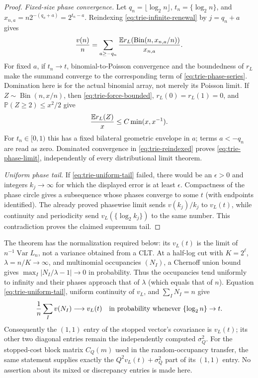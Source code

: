 \documentclass[11pt]{article}
\numberwithin{equation}{section}
\newcommand{\1}{\mathbf 1}\newcommand{\F}{\mathcal F}\newcommand{\D}{\mathcal D}
\begin{document}
\begin{proof}
\emph{Fixed-size phase convergence.}
Let $q_n=\lfloor\log _2n\rfloor$, $t_n=\{\log _2n\}$, and
$x_{n,a}=n2^{-(q_n+a)}=2^{t_n-a}$.  Reindexing
\eqref{eq:trie-infinite-renewal} by $j=q_n+a$ gives
\begin{equation}
 {v(n)\over n}=\sum_{a\ge-q_n}{
 \mathbb E r_L(\operatorname {Bin}(n,x_{n,a}/n))\over x_{n,a}}.      \label{eq:trie-reindexed}
\end{equation}
For fixed $a$, if $t_n\to t$, binomial-to-Poisson convergence and the
boundedness of $r_L$ make the summand converge to the corresponding term of
\eqref{eq:trie-phase-series}.  Domination here is for the actual binomial
array, not merely its Poisson limit.  If $Z\sim\operatorname {Bin}(n,x/n)$,
then \eqref{eq:trie-force-bounded}, $r_L(0)=r_L(1)=0$, and
$\mathbb P(Z\ge2)\le x^2/2$ give
\begin{equation}
 {\mathbb E r_L(Z)\over x}\le C\min(x,x^{-1}).           \label{eq:trie-binomial-majorant}
\end{equation}
For $t_n\in[0,1)$ this has a fixed bilateral geometric envelope in $a$;
terms $a<-q_n$ are read as zero.  Dominated convergence in
\eqref{eq:trie-reindexed} proves \eqref{eq:trie-phase-limit}, independently
of every distributional limit theorem.

\emph{Uniform phase tail.}
If \eqref{eq:trie-uniform-tail} failed, there would be an $\epsilon>0$ and
integers $k_j\to\infty$ for which the displayed error is at least
$\epsilon$.  Compactness of the phase circle gives a subsequence whose
phases converge to some $t$ (with endpoints identified).  The already proved
phasewise limit sends $v(k_j)/k_j$ to $v_L(t)$, while continuity and
periodicity send $v_L(\{\log _2k_j\})$ to the same number.  This
contradiction proves the claimed supremum tail.
\end{proof}

The theorem has the normalization required below: its $v_L(t)$ is the limit
of $n^{-1}\operatorname {Var}L_n$, not a variance obtained from a CLT.  At a
half-log cut with $K=2^\ell$, $\lambda=n/K\to\infty$, and multinomial
occupancies $(N_I)$, a Chernoff union bound gives
$\max_I|N_I/\lambda-1|\to0$ in probability.  Thus the occupancies tend
uniformly to infinity and their phases approach that of
$\lambda$ (which equals that of $n$).  Equation
\eqref{eq:trie-uniform-tail}, uniform continuity of $v_L$, and
$\sum_I N_I=n$ give
\begin{equation}
 {1\over n}\sum_Iv(N_I)\longrightarrow v_L(t)
 \quad\hbox{in probability whenever }\{\log _2n\}\to t. \label{eq:trie-occupancy-transfer}
\end{equation}
Consequently the $(1,1)$ entry of the stopped vector's covariance is
$v_L(t)$; its other two diagonal entries remain the independently computed
$\sigma_Q^2$.  For the stopped-cost block matrix $C_Q(m)$ used in the
random-occupancy transfer, the same statement supplies exactly the
$Q^2v_L(t)+\sigma_Q^2$ part of its $(1,1)$ entry.  No assertion about its
mixed or discrepancy entries is made here.
\end{document}
